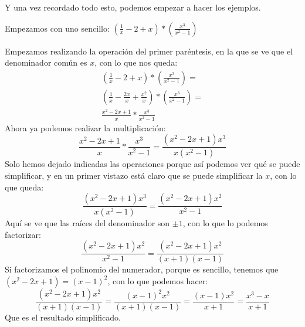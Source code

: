 \documentclass[a4paper,11pt,answers]{exam}
\begin{document}
Y una vez recordado todo esto, podemos empezar a hacer los ejemplos.
\begin{questions}
\question Empezamos con uno sencillo: $\left( \frac{1}{x} - 2 + x \right)*\left(\frac{x^3}{x^2 - 1}
  \right)$
  \begin{solution}
    Empezamos realizando la operación del primer paréntesis, en la que se ve que el denominador común es $x$, con lo que nos queda:
    \begin{gather*}
      \left( \frac{1}{x} - 2 + x \right)*\left(\frac{x^3}{x^2 - 1}\right) = \\
      \left( \frac{1}{x} - \frac{2x}{x} + \frac{x^2}{x} \right)*\left(\frac{x^3}{x^2 - 1}\right) = \\
      \frac{x^2 - 2x + 1}{x}*\frac{x^3}{x^2 - 1}
    \end{gather*}
    Ahora ya podemos realizar la multiplicación:
    \[\frac{x^2 - 2x + 1}{x}*\frac{x^3}{x^2 - 1} = \frac{(x^2 - 2x + 1)x^3}{x(x^2 - 1)}\]
    Solo hemos dejado indicadas las operaciones porque así podemos ver qué se puede simplificar,
    y en un primer vistazo está claro que se puede simplificar la $x$, con lo que queda:
    \[\frac{(x^2 - 2x + 1)x^3}{x(x^2 - 1)} = \frac{(x^2 - 2x + 1)x^2}{x^2 - 1}\]
    Aquí se ve que las raíces del denominador son $\pm 1$, con lo que lo podemos factorizar:
    \[\frac{(x^2 - 2x + 1)x^2}{x^2 - 1} = \frac{(x^2 - 2x + 1)x^2}{(x+1)(x-1)}\]
    Si factorizamos el polinomio del numerador, porque es sencillo, tenemos que $(x^2 - 2x +1 )=(x-1)^2$, con lo que podemos hacer:
    \[\frac{(x^2 - 2x + 1)x^2}{(x+1)(x-1)} = \frac{(x-1)^2x^2}{(x+1)(x-1)} =
      \frac{(x-1)x^2}{x+1} = \frac{x^3 - x}{x+1}\]
    Que es el resultado simplificado.
  \end{solution}
  

\end{questions}
\end{document}
